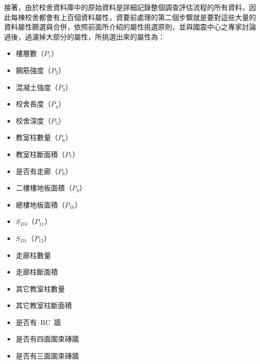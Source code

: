 接著，由於校舍資料庫中的原始資料是詳細記錄整個調查評估流程的所有資料，因此每棟校舍都會有上百個資料屬性，資要前處理的第二個步驟就是要對這些大量的資料屬性篩選與合併，依照前面所介紹的屬性挑選原則，並與國震中心之專家討論過後，過濾掉大部分的屬性，所挑選出來的屬性為：

\begin{multicols}{2}
\begin{itemize}
\item 樓層數（$P_1$）
\item 鋼筋強度（$P_2$）
\item 混凝土強度（$P_3$）
\item 校舍長度（$P_4$）
\item 校舍深度（$P_5$）
\item 教室柱數量（$P_6$）
\item 教室柱斷面積（$P_7$）
\item 是否有走廊（$P_8$）
\item 二樓樓地板面積（$P_9$）
\item 總樓地板面積（$P_{10}$）
\item $S_{DS}$（$P_{11}$）
\item $S_{D1}$（$P_{12}$）
\item 走廊柱數量
\item 走廊柱斷面積
\item 其它教室柱數量
\item 其它教室柱斷面積
\item 是否有~RC~牆
\item 是否有四面圍束磚牆
\item 是否有三面圍束磚牆
\end{itemize}
\end{multicols}


